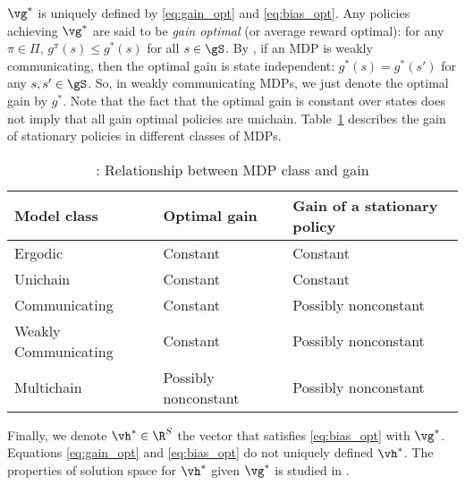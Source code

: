 $\vg^*$ is uniquely defined by \eqref{eq:gain_opt} and \eqref{eq:bias_opt}.
Any policies achieving $\vg^*$ are said to be \emph{gain optimal} (or average reward optimal): for any $\pi\in\Pi$, $g^\pi(s)\le g^*(s)$ for all $s\in\gS$.
By \cite[Theorem~8.3.2]{puterman2014markov}, if an MDP is weakly communicating, then the optimal gain is state independent: $g^*(s)=g^*(s')$ for any $s,s'\in\gS$.
So, in weakly communicating MDPs, we just denote the optimal gain by $g^*$.
Note that the fact that the optimal gain is constant over states does not imply that all gain optimal policies are unichain.
Table~\ref{tab:mdp_vs_gain} describes the gain of stationary policies in different classes of MDPs.
\begin{table}[ht]
    \begin{tabular}{lll}
        \hline
        Model class          & Optimal gain         & Gain of a stationary policy \\ \hline
        Ergodic              & Constant             & Constant                    \\
        Unichain             & Constant             & Constant                    \\
        Communicating        & Constant             & Possibly nonconstant        \\
        Weakly Communicating & Constant             & Possibly nonconstant        \\
        Multichain           & Possibly nonconstant & Possibly nonconstant       \\ \hline
    \end{tabular}
    \caption{\cite[Table~8.3.1]{puterman2014markov}: Relationship between MDP class and gain}
    \label{tab:mdp_vs_gain}
\end{table}
Finally, we denote $\vh^*\in\R^{S}$ the vector that satisfies \eqref{eq:bias_opt} with $\vg^*$.
Equations \eqref{eq:gain_opt} and \eqref{eq:bias_opt} do not uniquely defined $\vh^*$.
The properties of solution space for $\vh^*$ given $\vg^*$ is studied in \cite{schweitzer1978functional}.

\endgroup
